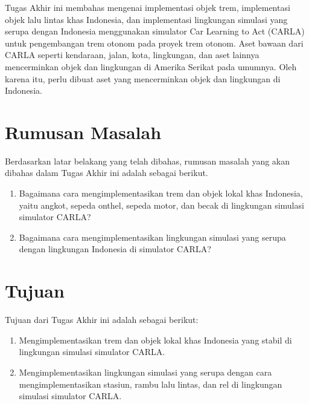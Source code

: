 Tugas Akhir ini membahas mengenai implementasi objek trem, implementasi objek
lalu lintas khas Indonesia, dan implementasi lingkungan simulasi yang serupa
dengan Indonesia menggunakan simulator Car Learning to Act (CARLA) untuk
pengembangan trem otonom pada proyek trem otonom. Aset bawaan dari CARLA seperti
kendaraan, jalan, kota, lingkungan, dan aset lainnya mencerminkan objek dan
lingkungan di Amerika Serikat pada umumnya. Oleh karena itu, perlu dibuat aset
yang mencerminkan objek dan lingkungan di Indonesia.


\section{Rumusan Masalah}

Berdasarkan latar belakang yang telah dibahas, rumusan masalah yang akan dibahas
dalam Tugas Akhir ini adalah sebagai berikut.

\begin{enumerate}

    \item Bagaimana cara mengimplementasikan trem dan objek lokal khas
    Indonesia, yaitu angkot, sepeda onthel, sepeda motor, dan becak
    di lingkungan simulasi simulator CARLA?

    \item Bagaimana cara mengimplementasikan lingkungan simulasi yang serupa
    dengan lingkungan Indonesia di simulator CARLA?



\end{enumerate}

\section{Tujuan}

Tujuan dari Tugas Akhir ini adalah sebagai berikut:

\begin{enumerate}

    \item Mengimplementasikan trem dan objek lokal khas Indonesia yang stabil di
    lingkungan simulasi simulator CARLA.

    \item Mengimplementasikan lingkungan simulasi yang serupa dengan cara
    mengimplementasikan stasiun, rambu lalu lintas, dan rel di lingkungan
    simulasi simulator CARLA.


\end{enumerate}

